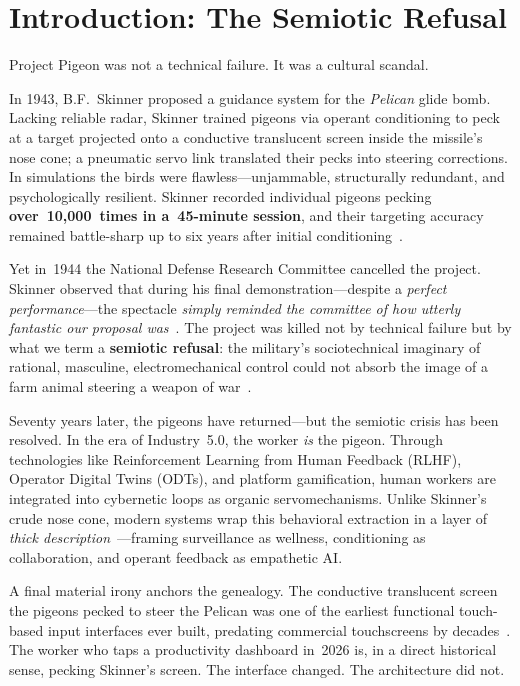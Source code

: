 \documentclass[runningheads]{llncs}
\begin{document}
\section{Introduction: The Semiotic Refusal}

Project Pigeon was not a technical failure. It was a cultural scandal.

In 1943, B.F.~Skinner proposed a guidance system for the \emph{Pelican} glide
bomb. Lacking reliable radar, Skinner trained pigeons via operant conditioning
to peck at a target projected onto a conductive translucent screen inside the
missile's nose cone; a pneumatic servo link translated their pecks into steering
corrections. In simulations the birds were flawless---unjammable, structurally
redundant, and psychologically resilient. Skinner recorded individual pigeons
pecking \textbf{over~10,000~times in a~45-minute session}, and their targeting
accuracy remained battle-sharp up to six years after initial
conditioning~\cite{skinner1960pigeons,cyberneticzoo2025}.

Yet in~1944 the National Defense Research Committee cancelled the project.
Skinner observed that during his final demonstration---despite a
\emph{perfect performance}---the spectacle \emph{simply reminded the committee
of how utterly fantastic our proposal was}~\cite{skinner1960pigeons}. The
project was killed not by technical failure but by what we term a
\textbf{semiotic refusal}: the military's sociotechnical imaginary of rational,
masculine, electromechanical control could not absorb the image of a farm
animal steering a weapon of war~\cite{pigeonbombs2025}.

Seventy years later, the pigeons have returned---but the semiotic crisis has
been resolved. In the era of Industry~5.0, the worker \emph{is} the pigeon.
Through technologies like Reinforcement Learning from Human Feedback (RLHF),
Operator Digital Twins (ODTs), and platform gamification, human workers are
integrated into cybernetic loops as organic servomechanisms. Unlike Skinner's
crude nose cone, modern systems wrap this behavioral extraction in a layer of
\emph{thick description}~\cite{geertz1973interpretation}---framing surveillance
as wellness, conditioning as collaboration, and operant feedback as empathetic
AI.

A final material irony anchors the genealogy. The conductive translucent screen
the pigeons pecked to steer the Pelican was one of the earliest functional
touch-based input interfaces ever built, predating commercial touchscreens by
decades~\cite{pigeonbombs2025,nist2025}. The worker who taps a productivity
dashboard in~2026 is, in a direct historical sense, pecking Skinner's screen.
The interface changed. The architecture did not.
\end{document}
